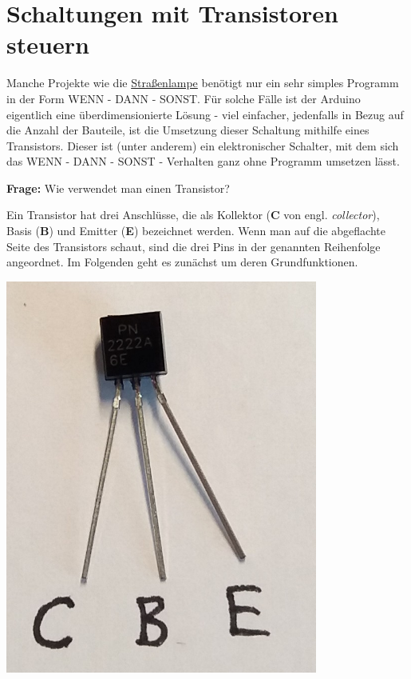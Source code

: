 \newpage
\section{Schaltungen mit Transistoren steuern}
\label{sec:transistor}

Manche Projekte wie die \hyperref[proj:strassenlampe]{Straßenlampe} benötigt nur ein sehr simples Programm in der Form WENN - DANN - SONST. Für solche Fälle ist der Arduino eigentlich eine überdimensionierte Lösung - viel einfacher, jedenfalls in Bezug auf die Anzahl der Bauteile, ist die Umsetzung dieser Schaltung mithilfe eines Transistors. Dieser ist (unter anderem) ein elektronischer Schalter, mit dem sich das WENN - DANN - SONST - Verhalten ganz ohne Programm umsetzen lässt.

\begin{ziel}
	\textbf{Frage:} Wie verwendet man einen Transistor?
\end{ziel}

\medskip
\begin{minipage}{0.85\textwidth}
	Ein Transistor hat drei Anschlüsse, die als Kollektor (\textbf{C} von engl. \emph{collector}), Basis (\textbf{B}) und Emitter (\textbf{E}) bezeichnet werden. Wenn man auf die abgeflachte Seite des Transistors schaut, sind die drei Pins in der genannten Reihenfolge angeordnet. Im Folgenden geht es zunächst um deren Grundfunktionen.
\end{minipage}
\hfill
\begin{minipage}{0.13\textwidth}
	\centering
	\includegraphics[width=0.77\textwidth]{./pics/transistor.jpg}
\end{minipage}

